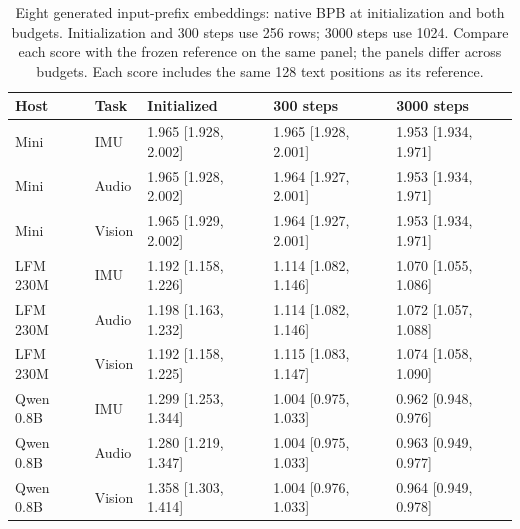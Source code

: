 \begin{table}[!htbp]\centering\small
\setlength{\tabcolsep}{4pt}
\caption{Eight generated input-prefix embeddings: native BPB at initialization and both budgets. Initialization and 300 steps use 256 rows; 3000 steps use 1024. Compare each score with the frozen reference on the same panel; the panels differ across budgets. Each score includes the same 128 text positions as its reference.}\label{tab:prefix}
\begin{tabular}{@{}lllll@{}}
\toprule
Host & Task & Initialized & 300 steps & 3000 steps \\
\midrule
Mini & IMU & 1.965 [1.928, 2.002] & 1.965 [1.928, 2.001] & 1.953 [1.934, 1.971] \\
Mini & Audio & 1.965 [1.928, 2.002] & 1.964 [1.927, 2.001] & 1.953 [1.934, 1.971] \\
Mini & Vision & 1.965 [1.929, 2.002] & 1.964 [1.927, 2.001] & 1.953 [1.934, 1.971] \\
LFM 230M & IMU & 1.192 [1.158, 1.226] & 1.114 [1.082, 1.146] & 1.070 [1.055, 1.086] \\
LFM 230M & Audio & 1.198 [1.163, 1.232] & 1.114 [1.082, 1.146] & 1.072 [1.057, 1.088] \\
LFM 230M & Vision & 1.192 [1.158, 1.225] & 1.115 [1.083, 1.147] & 1.074 [1.058, 1.090] \\
Qwen 0.8B & IMU & 1.299 [1.253, 1.344] & 1.004 [0.975, 1.033] & 0.962 [0.948, 0.976] \\
Qwen 0.8B & Audio & 1.280 [1.219, 1.347] & 1.004 [0.975, 1.033] & 0.963 [0.949, 0.977] \\
Qwen 0.8B & Vision & 1.358 [1.303, 1.414] & 1.004 [0.976, 1.033] & 0.964 [0.949, 0.978] \\
\bottomrule
\end{tabular}
\end{table}\par
